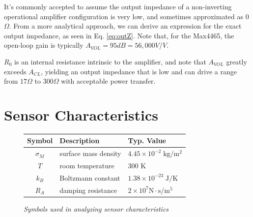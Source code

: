 \documentclass[journal]{IEEEtran}
\begin{document}
It's commonly accepted to assume the output impedance of a non-inverting operational amplifier configuration is very low, and sometimes approximated as 0$\Omega$. From a more analytical approach, we can derive an expression for the exact output impedance, as seen in Eq. \ref{eq:outZ}. Note that, for the Max4465, the open-loop gain is typically $A_{VOL} = 95 dB = 56,000 V/V$. 

$R_{0}$ is an internal resistance intrinsic to the amplifier, and note that $A_{VOL}$ greatly exceeds $A_{CL}$, yielding an output impedance that is low and can drive a range from $17 \Omega$ to $300 \Omega$ with acceptable power transfer. 


\section{Sensor Characteristics}

\begin{figure}[ht]
	\centering	
	\begin{tabular}{ c | l | l }
		\hline
		\bf Symbol & \bf Description & \bf Typ. Value \\
		\hline
		$\sigma_M$ & surface mass density & $4.45 \times 10^{-2} \; \mathrm{kg/m^2}$ \\
		$T$ & room temperature & 300 K \\
		$k_B$ & Boltzmann constant & $1.38 \times 10^{-23} \; \mathrm{J/K}$ \\
		$R_A$ & damping resistance & $2 \times 10^7 \mathrm{N \cdot s/m^5}$ \\
	\end{tabular}
	
	\caption{\em Symbols used in analyzing sensor characteristics}
	\label{fig:CharSymbols}
\end{figure}
\end{document}
